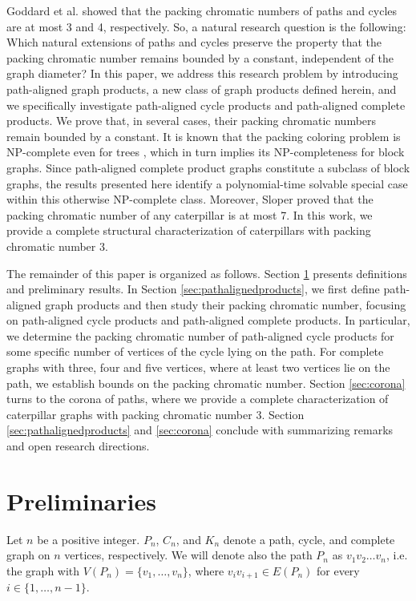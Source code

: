 \documentclass{article}
\begin{document}
Goddard et al.\cite{goddard2008broadcast} showed that the packing chromatic numbers of paths and cycles are at most 3 and 4, respectively. So, a natural research question is the following: Which natural extensions of paths and cycles preserve the property that the packing chromatic number remains bounded by a constant, independent of the graph diameter? In this paper, we address this research problem by introducing path-aligned graph products, a new class of graph products defined herein, and we specifically investigate path-aligned cycle products and path-aligned complete products. We prove that, in several cases, their packing chromatic numbers remain bounded by a constant. It is known that the packing coloring problem is NP-complete even for trees \cite{fiala}, which in turn implies its NP-completeness for block graphs. Since path-aligned complete product graphs constitute a subclass of block graphs, the results presented here identify a polynomial-time solvable special case within this otherwise NP-complete class. Moreover, Sloper \cite{sloper} proved that the packing chromatic number of any caterpillar is at most 7. In this work, we provide a complete structural characterization of caterpillars with packing chromatic number 3.

The remainder of this paper is organized as follows. Section \ref{ref:prelim} presents definitions and preliminary results. In Section \ref{sec:pathalignedproducts}, we first define path-aligned graph products and then study their packing chromatic number, focusing on path-aligned cycle products and path-aligned complete products. In particular, we determine the packing chromatic number of path-aligned cycle products for some specific number of vertices of the cycle lying on the path.
For complete graphs with three, four and five vertices, where at least two vertices lie on the path, we establish bounds on the packing chromatic number. Section \ref{sec:corona} turns to the corona of paths, where we provide a complete characterization of caterpillar graphs with packing chromatic number 3. 
Section \ref{sec:pathalignedproducts} and \ref{sec:corona} conclude with summarizing remarks and open research directions.

\section{Preliminaries} \label{ref:prelim}
Let $n$ be a positive integer. $P_n$, $C_n$, and $K_n$ denote a path, cycle, and complete graph on $n$ vertices, respectively. 
We will denote also the path \( P_n \) as $v_1v_2 \dots v_n$, i.e. the graph with
\( V(P_n) = \{v_1, \ldots, v_n\} \), where \( v_i v_{i+1} \in E(P_n) \) for every \( i \in \{1, \ldots, n-1\} \). 
\end{document}
